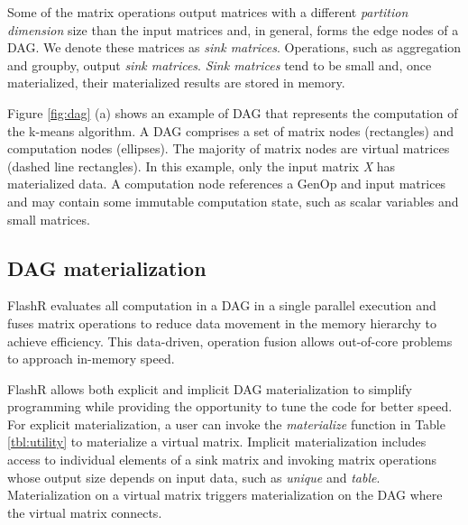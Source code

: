 Some of the matrix operations output matrices with
a different \textit{partition dimension} size than the input matrices and,
in general, forms the edge nodes of a DAG. We denote these matrices as
\textit{sink matrices}. Operations, such as aggregation and groupby,
output \textit{sink matrices}. \textit{Sink matrices} tend to be small and, once
materialized, their materialized results are stored in memory.

Figure \ref{fig:dag} (a) shows an example of DAG that represents the computation
of the k-means algorithm. A DAG comprises a set of
matrix nodes (rectangles) and computation nodes (ellipses). The majority of
matrix nodes are virtual matrices (dashed line rectangles).
In this example, only the input matrix \textit{X} has materialized data.
A computation node references a GenOp and input matrices and
may contain some immutable computation state, such as scalar variables and
small matrices. 

\subsection{DAG materialization}\label{sec:materialize}
FlashR evaluates all computation in a DAG in a single parallel execution
and fuses matrix operations to reduce data
movement in the memory hierarchy to achieve efficiency. This data-driven,
operation fusion allows out-of-core problems to approach in-memory speed.

FlashR allows both explicit and implicit DAG materialization to simplify
programming while providing the opportunity to tune the code for
better speed. For explicit materialization, a user can invoke the
\textit{materialize} function in Table \ref{tbl:utility} to materialize
a virtual matrix. Implicit materialization includes access to individual
elements of a sink matrix and invoking matrix operations whose output size
depends on input data, such as \textit{unique} and \textit{table}. Materialization
on a virtual matrix triggers materialization on the DAG where the virtual
matrix connects.

